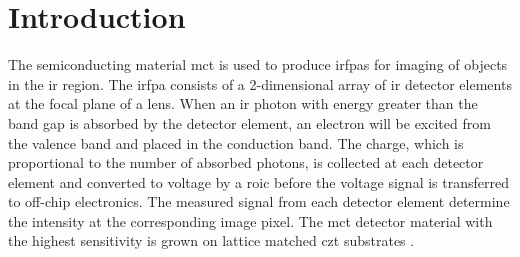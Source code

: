 \chapter{Introduction}




The semiconducting material \ac{mct} is used to produce \acp{irfpa} for imaging of objects in the \ac{ir} region. The \ac{irfpa} consists of a 2-dimensional array of \ac{ir} detector elements at the focal plane of a lens. When an \ac{ir} photon with energy greater than the band gap is absorbed by the detector element, an electron will be excited from the valence band and placed in the conduction band. The charge, which is proportional to the number of absorbed photons, is collected at each detector element and converted to voltage by a \ac{roic} before the voltage signal is transferred to off-chip electronics. The measured signal from each detector element determine the intensity at the corresponding image pixel. The \ac{mct} detector material with the highest sensitivity is grown on lattice matched \ac{czt} substrates \citep{benson2016analysis}.

